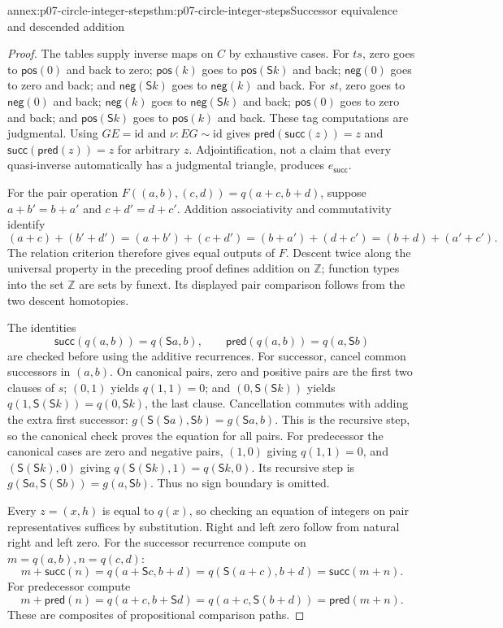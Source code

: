 \begin{annexitem}{annex:p07-circle-integer-steps}{thm:p07-circle-integer-steps}{Successor equivalence and descended addition}
\begin{proof}
The tables supply inverse maps on \(C\) by exhaustive cases.
For \(ts\), zero goes to \(\mathsf{pos}(0)\) and back to zero;
\(\mathsf{pos}(k)\) goes to \(\mathsf{pos}(\mathsf Sk)\) and back;
\(\mathsf{neg}(0)\) goes to zero and back; and
\(\mathsf{neg}(\mathsf Sk)\) goes to \(\mathsf{neg}(k)\) and back.
For \(st\), zero goes to \(\mathsf{neg}(0)\) and back;
\(\mathsf{neg}(k)\) goes to \(\mathsf{neg}(\mathsf Sk)\) and back;
\(\mathsf{pos}(0)\) goes to zero and back; and
\(\mathsf{pos}(\mathsf Sk)\) goes to \(\mathsf{pos}(k)\) and back.
These tag computations are judgmental. Using \(GE=\mathrm{id}\)
and \(\nu:EG\sim\mathrm{id}\) gives
\(\mathsf{pred}(\mathsf{succ}(z))=z\) and
\(\mathsf{succ}(\mathsf{pred}(z))=z\) for arbitrary \(z\).
Adjointification, not a claim that every quasi-inverse automatically has
a judgmental triangle, produces \(e_{\mathsf{succ}}\).

For the pair operation \(F((a,b),(c,d))=q(a+c,b+d)\), suppose
\(a+b'=b+a'\) and \(c+d'=d+c'\). Addition associativity and
commutativity identify
\[
(a+c)+(b'+d')=(a+b')+(c+d')
 =(b+a')+(d+c')=(b+d)+(a'+c').
\]
The relation criterion therefore gives equal outputs of \(F\).
Descent twice along the universal property in the preceding proof
defines addition on \(\mathbb Z\); function types into the set
\(\mathbb Z\) are sets by funext. Its displayed pair comparison follows
from the two descent homotopies.

The identities
\[
\mathsf{succ}(q(a,b))=q(\mathsf Sa,b),\qquad
\mathsf{pred}(q(a,b))=q(a,\mathsf Sb)
\]
are checked before using the additive recurrences. For successor,
cancel common successors in \((a,b)\). On canonical pairs, zero and
positive pairs are the first two clauses of \(s\); \((0,1)\) yields
\(q(1,1)=0\); and \((0,\mathsf S(\mathsf Sk))\) yields
\(q(1,\mathsf S(\mathsf Sk))=q(0,\mathsf Sk)\), the last clause.
Cancellation commutes with adding the extra first successor:
\(g(\mathsf S(\mathsf Sa),\mathsf Sb)=g(\mathsf Sa,b)\).
This is the recursive step, so the canonical check proves the equation
for all pairs. For predecessor the canonical cases are zero and
negative pairs, \((1,0)\) giving \(q(1,1)=0\), and
\((\mathsf S(\mathsf Sk),0)\) giving
\(q(\mathsf S(\mathsf Sk),1)=q(\mathsf Sk,0)\).
Its recursive step is
\(g(\mathsf Sa,\mathsf S(\mathsf Sb))=g(a,\mathsf Sb)\).
Thus no sign boundary is omitted.

Every \(z=(x,h)\) is equal to \(q(x)\), so checking an equation of
integers on pair representatives suffices by substitution.
Right and left zero follow from natural right and left zero.
For the successor recurrence compute on \(m=q(a,b),n=q(c,d)\):
\[
m+\mathsf{succ}(n)
 =q(a+\mathsf Sc,b+d)
 =q(\mathsf S(a+c),b+d)
 =\mathsf{succ}(m+n).
\]
For predecessor compute
\[
m+\mathsf{pred}(n)
 =q(a+c,b+\mathsf Sd)
 =q(a+c,\mathsf S(b+d))
 =\mathsf{pred}(m+n).
\]
These are composites of propositional comparison paths.
\end{proof}
\end{annexitem}


